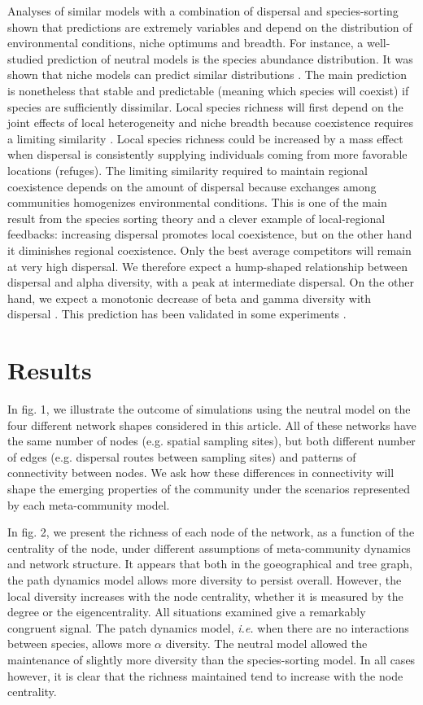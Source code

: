 \documentclass[12pt]{article}
\begin{document}
Analyses of similar models with a combination of dispersal and species-sorting
shown that predictions are extremely variables and depend on the distribution of
environmental conditions, niche optimums and breadth. For instance, a
well-studied prediction of neutral models is the species abundance distribution.
It was shown that niche models can predict similar distributions
\parencite{Tilman2004,Gravel2006}. The main prediction is nonetheless that
stable and predictable (meaning which species will coexist) if species are
sufficiently dissimilar. Local species richness will first depend on the joint
effects of local heterogeneity and niche breadth because coexistence requires a
limiting similarity \parencite{Schwilk2005}. Local species richness could be
increased by a mass effect when dispersal is consistently supplying individuals
coming from more favorable locations (refuges). The limiting similarity required
to maintain regional coexistence depends on the amount of dispersal because
exchanges among communities homogenizes environmental conditions. This is one of
the main result from the species sorting theory and a clever example of
local-regional feedbacks: increasing dispersal promotes local coexistence, but
on the other hand it diminishes regional coexistence. Only the best average
competitors will remain at very high dispersal.  We therefore expect a
hump-shaped relationship between dispersal and alpha diversity, with a peak at
intermediate dispersal. On the other hand, we expect a monotonic decrease of
beta and gamma diversity with dispersal \parencite{Mouquet2003}. This prediction
has been validated in some experiments \parencite{Venail2008, Logue2011}.

\section{Results}

In fig. 1, we illustrate the outcome of simulations using the neutral model on
the four different network shapes considered in this article. All of these
networks have the same number of nodes (e.g. spatial sampling sites), but both
different number of edges (e.g. dispersal routes between sampling sites) and
patterns of connectivity between nodes. We ask how these differences in
connectivity will shape the emerging properties of the community under the
scenarios represented by each meta-community model.

In fig. 2, we present the richness of each node of the network, as a function of
the centrality of the node, under different assumptions of meta-community
dynamics and network structure. It appears that both in the goeographical and
tree graph, the path dynamics model allows more diversity to persist overall.
However, the local diversity increases with the node centrality, whether it is
measured by the degree or the eigencentrality. All situations examined give a
remarkably congruent signal. The patch dynamics model, \emph{i.e.} when there
are no interactions between species, allows more $\alpha$ diversity. The neutral
model allowed the maintenance of slightly more diversity than the
species-sorting model. In all cases however, it is clear that the richness
maintained tend to increase with the node centrality.
\end{document}
